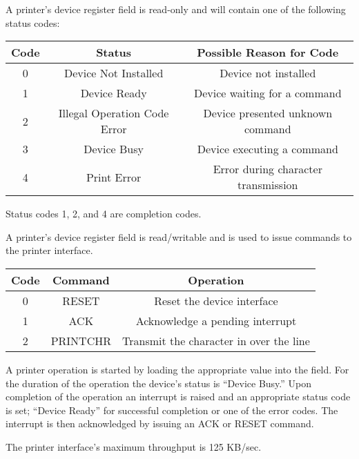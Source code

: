 
A printer’s device register  field is read-only and will contain one of the following status codes:

\begin{center}
	\begin{tabular}{|c|c|c|}
		\hline
		Code & Status & Possible Reason for Code\\
		\hline
		\hline
		0 & Device Not Installed & Device not installed\\
		\hline
		1 & Device Ready & Device waiting for a command\\
		\hline
		2 & Illegal Operation Code Error & Device presented unknown command\\
		\hline
		3 & Device Busy & Device executing a command\\
		\hline
		4 & Print Error & Error during character transmission\\
		\hline
	\end{tabular}
\end{center}

Status codes 1, 2, and 4 are completion codes.

A printer’s device register  field is read/writable and is used to issue commands to the printer interface.

\begin{center}
	\begin{tabular}{|c|c|c|}
		\hline
		Code & Command & Operation\\
		\hline
		\hline
		0 & RESET & Reset the device interface\\
		\hline
		1 & ACK & Acknowledge a pending interrupt\\
		\hline
		2 & PRINTCHR & Transmit the character in \register{DATA0} over the line\\
		\hline
	\end{tabular}
\end{center}

A printer operation is started by loading the appropriate value into the  field. 
For the duration of the operation the device’s status is “Device Busy.” 
Upon completion of the operation an interrupt is raised and an appropriate status code is set; “Device Ready” for successful completion or one of the error codes. 
The interrupt is then acknowledged by issuing an ACK or RESET command.

The printer interface’s maximum throughput is 125 KB/sec.


